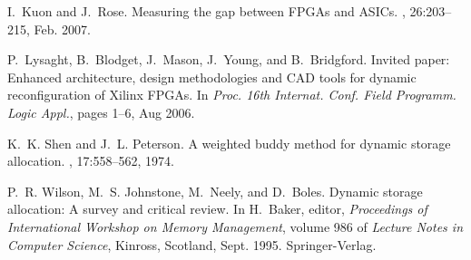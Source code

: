 \documentclass{article}
\begin{document}
\begin{thebibliography}{10}
I.~{Kuon} and J.~{Rose}.
\newblock Measuring the gap between {FPGAs} and {ASICs}.
, 26:203--215, Feb.
  2007.

P.~Lysaght, B.~Blodget, J.~Mason, J.~Young, and B.~Bridgford.
\newblock Invited paper: Enhanced architecture, design methodologies and {CAD}
  tools for dynamic reconfiguration of {Xilinx FPGAs}.
\newblock In {\em Proc. 16th Internat. Conf. Field Programm. Logic Appl.},
  pages 1--6, Aug 2006.

K.~K. Shen and J.~L. Peterson.
\newblock A weighted buddy method for dynamic storage allocation.
, 17:558--562, 1974.

P.~R. Wilson, M.~S. Johnstone, M.~Neely, and D.~Boles.
\newblock Dynamic storage allocation: {A} survey and critical review.
\newblock In H.~Baker, editor, {\em Proceedings of International Workshop on
  Memory Management}, volume 986 of {\em Lecture Notes in Computer Science},
  Kinross, Scotland, Sept. 1995. Springer-Verlag.

\end{thebibliography}
 
\iffalse
\newpage

\begin{appendix}
\section{Comparison to \cite{fktvakt-nbddr-08}}
All sections of the paper have been thoroughly revised and updated.
In particular, Section 1.2, Section 2 (notably Theorem 2), and Section 4
are substantially enhanced. 
Section 6, Section 8.2, and Section 8.3 contain new material.
\end{appendix}
\fi
\end{document}
